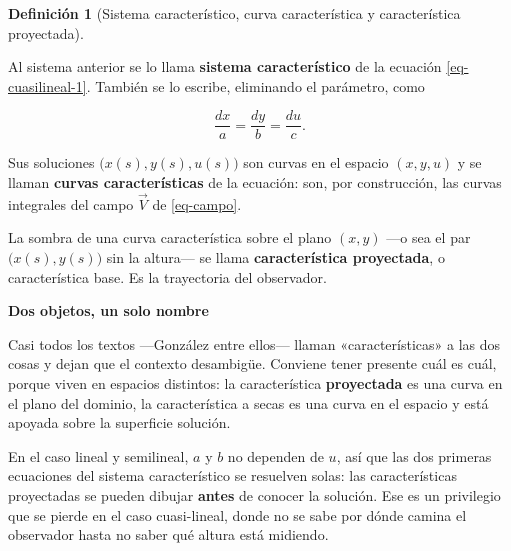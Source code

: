 \documentclass[
  spanish,
  a4paper,
]{scrbook}
\theoremstyle{definition}
\newtheorem{definition}{Definición}[chapter]
\theoremstyle{plain}
\theoremstyle{definition}
\theoremstyle{plain}
\theoremstyle{definition}
\theoremstyle{remark}
\begin{document}
\begin{definition}[Sistema característico, curva característica y
característica
proyectada]\protect\hypertarget{def-sistema-caracteristico}{}\label{def-sistema-caracteristico}

Al sistema anterior se lo llama \textbf{sistema característico} de la
ecuación \ref{eq-cuasilineal-1}. También se lo escribe, eliminando el
parámetro, como

\[
\frac{dx}{a} = \frac{dy}{b} = \frac{du}{c} .
\]

Sus soluciones \(\big(x(s),y(s),u(s)\big)\) son curvas en el espacio
\((x,y,u)\) y se llaman \textbf{curvas características} de la ecuación:
son, por construcción, las curvas integrales del campo \(\vec V\) de
\ref{eq-campo}.

La sombra de una curva característica sobre el plano \((x,y)\) ---o sea
el par \(\big(x(s),y(s)\big)\) sin la altura--- se llama
\textbf{característica proyectada}, o característica base. Es la
trayectoria del observador.

\end{definition}

\begin{tcolorbox}[enhanced jigsaw, arc=.35mm, bottomrule=.15mm, breakable, colback=white, colframe=quarto-callout-warning-color-frame, left=2mm, leftrule=.75mm, opacityback=0, rightrule=.15mm, toprule=.15mm]
\begin{minipage}[t]{5.5mm}
\textcolor{quarto-callout-warning-color}{\faExclamationTriangle}
\end{minipage}%
\begin{minipage}[t]{\textwidth - 5.5mm}

\vspace{-3mm}\textbf{Dos objetos, un solo nombre}\vspace{3mm}

Casi todos los textos ---González entre ellos--- llaman
«características» a las dos cosas y dejan que el contexto desambigüe.
Conviene tener presente cuál es cuál, porque viven en espacios
distintos: la característica \textbf{proyectada} es una curva en el
plano del dominio, la característica a secas es una curva en el espacio
y está apoyada sobre la superficie solución.

En el caso lineal y semilineal, \(a\) y \(b\) no dependen de \(u\), así
que las dos primeras ecuaciones del sistema característico se resuelven
solas: las características proyectadas se pueden dibujar \textbf{antes}
de conocer la solución. Ese es un privilegio que se pierde en el caso
cuasi-lineal, donde no se sabe por dónde camina el observador hasta no
saber qué altura está midiendo.

\end{minipage}%
\end{tcolorbox}
\end{document}
